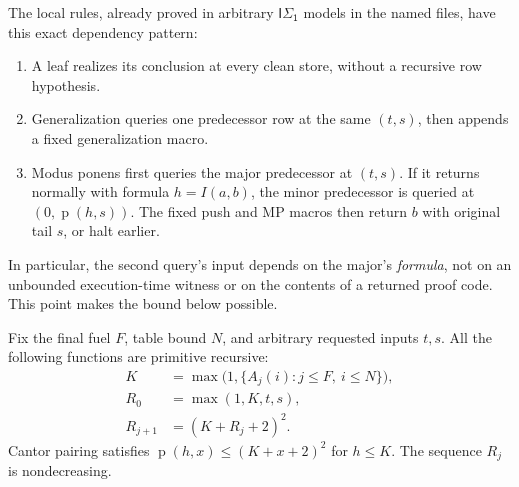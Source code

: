 \documentclass[11pt]{article}
\newcommand{\isone}{\mathsf{I\Sigma_1}}
\newcommand{\p}{\operatorname{p}}
\begin{document}
The local rules, already proved in arbitrary $\isone$ models in the named
files, have this exact dependency pattern:
\begin{enumerate}
\item A leaf realizes its conclusion at every clean store, without a
      recursive row hypothesis.
\item Generalization queries one predecessor row at the same $(t,s)$,
      then appends a fixed generalization macro.
\item Modus ponens first queries the major predecessor at $(t,s)$.
      If it returns normally with formula $h=I(a,b)$, the minor predecessor
      is queried at $(0,\p(h,s))$. The fixed push and MP macros then return
      $b$ with original tail $s$, or halt earlier.
\end{enumerate}
In particular, the second query's input depends on the major's \emph{formula},
not on an unbounded execution-time witness or on the contents of a returned
proof code. This point makes the bound below possible.

Fix the final fuel $F$, table bound $N$, and arbitrary requested inputs $t,s$.
All the following functions are primitive recursive:
\begin{align*}
 K&=\max\bigl(1,\{A_j(i):j\le F,\ i\le N\}\bigr),\\
 R_0&=\max(1,K,t,s),\\
 R_{j+1}&=(K+R_j+2)^2.
\end{align*}
Cantor pairing satisfies $\p(h,x)\le(K+x+2)^2$ for $h\le K$.
The sequence $R_j$ is nondecreasing.
\end{document}
